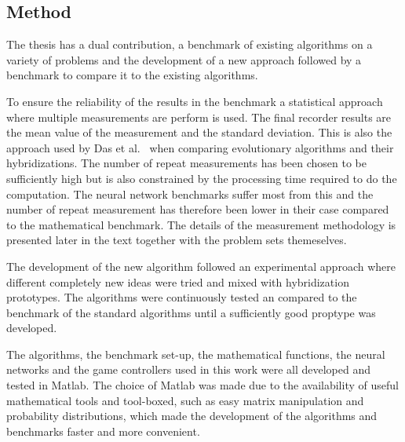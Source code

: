 \subsection{Method}

The thesis has a dual contribution, a benchmark of existing algorithms on a variety of problems and the development of a new approach followed by a benchmark to compare it to the existing algorithms.

To ensure the reliability of the results in the benchmark a statistical approach where multiple measurements are perform is used. The final recorder results are the mean value of the measurement and the standard deviation. This is also the approach used by Das et al.~\cite{Das2008} when comparing evolutionary algorithms and their hybridizations. The number of repeat measurements has been chosen to be sufficiently high but is also constrained by the processing time required to do the computation. The neural network benchmarks suffer most from this and the number of repeat measurement has therefore been lower in their case compared to the mathematical benchmark. The details of the measurement methodology is presented later in the text together with the problem sets themeselves.

The development of the new algorithm followed an experimental approach where different completely new ideas were tried and mixed with hybridization prototypes. The algorithms were continuously tested an compared to the benchmark of the standard algorithms until a sufficiently good proptype was developed.

The algorithms, the benchmark set-up, the mathematical functions, the neural networks and the game controllers used in this work were all developed and tested in Matlab. The choice of Matlab was made due to the availability of useful mathematical tools and tool-boxed, such as easy matrix manipulation and probability distributions, which made the development of the algorithms and benchmarks faster and more convenient.
